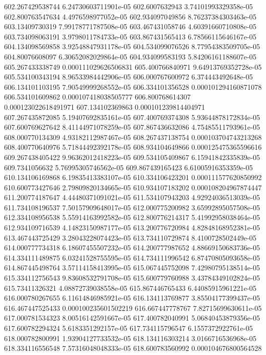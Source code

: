 {602.267429538744 6.24730603711901e-05
602.6007632943 3.74101993329358e-05
602.800763547634 4.4976598977052e-05
602.934097049856 8.76237384303463e-05
603.13409730319 7.99178771787508e-05
603.467431058746 4.60391660710808e-05
603.734098063191 3.9798011784733e-05
603.867431565413 6.78566115646167e-05
604.134098569858 3.92548847931178e-05
604.534099076526 8.77954383509705e-05
604.80076608097 6.30652082029864e-05
604.934099583193 5.84206161188607e-05
605.267433338749 0.000111029626506831
605.400766840971 9.64913769352728e-05
605.534100343194 8.96533984442906e-05
606.000767600972 6.374443492648e-05
606.134101103195 7.90549999268552e-05
606.334101356528 0.000101294160871078
606.534101609862 0.000107418038505777
606.800768614307 0.000123022618491971
607.134102369863 0.000101239814404971
607.267435872085 5.19407692835161e-05
607.400769374308 5.93644878172834e-05
607.600769627642 8.41144971078259e-05
607.867436632086 4.75485511793961e-05
608.000770134309 4.93182112987467e-05
608.267437138754 0.000103704743213268
608.400770640976 5.71844492392178e-05
608.934104649866 0.000125475365596616
609.267438405422 9.96362012418223e-05
609.534105409867 6.15941842335839e-05
609.7341056632 5.76995305746562e-05
609.867439165423 6.61005916353359e-05
610.134106169868 6.19835413383107e-05
610.334106423201 0.000111577620850992
610.600773427646 2.79809820134665e-05
610.934107183202 0.000108204967874447
611.200774187647 4.44480371091021e-05
611.534107943203 4.92924036513039e-05
611.734108196537 7.50157909648017e-05
612.000775200982 3.65992895057508e-05
612.334108956538 5.55914163992582e-05
612.800776214317 5.41992958038464e-05
612.934109716539 4.14823150987177e-05
613.200776720984 4.82848168952381e-05
613.467443725429 3.28043228074423e-05
613.734110729874 8.4100728502449e-05
614.000777734318 6.18607455507232e-05
614.200777987652 4.88669150683736e-05
614.334111489875 6.03241528755595e-05
614.734111996542 6.87470805093658e-05
614.867445498764 3.57114158413995e-05
615.067445752098 7.42980795138514e-05
615.334112756543 9.83608532791708e-05
615.600779760988 3.43784349102824e-05
615.73411326321 4.08872739038558e-05
615.867446765433 6.44085915961221e-05
616.000780267655 6.11614846985921e-05
616.134113769877 3.85504177399437e-05
616.467447525433 0.000100235601502219
616.667447778767 7.82715699630611e-05
617.000781534323 8.00516142591667e-05
617.400782040991 5.06840453879356e-05
617.600782294324 5.6183351292157e-05
617.734115796547 6.1557372922761e-05
618.000782800991 1.93904127733532e-05
618.134116303214 3.0166716536968e-05
618.334116556548 7.57316048048333e-05
618.600783560992 0.000104676800564528
}

